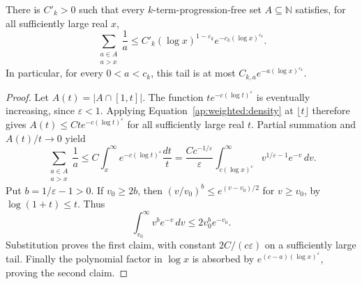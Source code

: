 \begin{corollary}\label{ap:weighted:tail}
There is $C'_k>0$ such that every $k$-term-progression-free set
$A\subseteq\mathbb N$ satisfies, for all sufficiently large real $x$,
\[
 \sum_{\substack{a\in A\\a>x}}\frac1a
 \le C'_k(\log x)^{1-\varepsilon_k}
                e^{-c_k(\log x)^{\varepsilon_k}}.
\]
In particular, for every $0<a<c_k$, this tail is at most
$C_{k,a}e^{-a(\log x)^{\varepsilon_k}}$.
\end{corollary}

\begin{proof}
Let $A(t)=|A\cap[1,t]|$. The function
$t e^{-c(\log t)^\varepsilon}$ is eventually increasing, since
$\varepsilon<1$. Applying Equation~\eqref{ap:weighted:density} at
$\lfloor t\rfloor$ therefore gives
$A(t)\le Ct e^{-c(\log t)^\varepsilon}$ for all sufficiently large
real $t$. Partial summation and $A(t)/t\to0$ yield
\[
 \sum_{\substack{a\in A\\a>x}}\frac1a
 \le C\int_x^\infty e^{-c(\log t)^\varepsilon}\frac{dt}{t}
 =\frac{C c^{-1/\varepsilon}}{\varepsilon}
       \int_{c(\log x)^\varepsilon}^\infty
                  v^{1/\varepsilon-1}e^{-v}\,dv.
\]
Put $b=1/\varepsilon-1>0$. If $v_0\ge2b$, then
$(v/v_0)^b\le e^{(v-v_0)/2}$ for $v\ge v_0$, by
$\log(1+t)\le t$. Thus
\[
       \int_{v_0}^\infty v^b e^{-v}\,dv
                         \le2v_0^b e^{-v_0}.
\]
Substitution proves the first claim, with constant $2C/(c\varepsilon)$
on a sufficiently large tail. Finally the polynomial factor in
$\log x$ is absorbed by
$e^{(c-a)(\log x)^\varepsilon}$, proving the second claim.
\end{proof}
